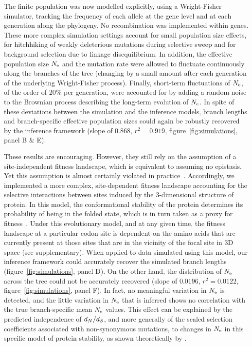 The finite population was now modelled explicitly, using a Wright-Fisher simulator, tracking the frequency of each {allele} at the gene level and at each generation along the phylogeny.
No {recombination} was implemented within genes.
These more complex simulation settings account for small population size effects, for hitchhiking of weakly deleterious mutations during selective sweep and for background selection due to linkage disequilibrium.
In addition, the {effective population size} $N_{\text{e}}$ and the mutation rate were allowed to fluctuate continuously along the branches of the tree (changing by a small amount after each generation of the underlying Wright-Fisher process).
Finally, short-term fluctuations of $N_{\text{e}}$, of the order of 20\% per generation, were accounted for by adding a random noise to the Brownian process describing the long-term evolution of $N_{\text{e}}$.
In spite of these deviations between the simulation and the inference models, branch lengths and branch-specific {effective population sizes} could again be robustly recovered by the inference framework (slope of $0.868$, $r^2=0.919$, figure~\ref{fig:simulations}, panel B \& E).

These results are encouraging.
However, they still rely on the assumption of a site-independent fitness landscape, which is equivalent to assuming no epistasis.
Yet this assumption is almost certainly violated in practice~\citep{Pollock2014,Shah2015}.
Accordingly, we implemented a more complex, site-dependent fitness landscape accounting for the selective interactions between sites induced by the 3-dimensional structure of protein.
In this model, the conformational stability of the protein determines its probability of being in the folded state, which is in turn taken as a proxy for fitness~\citep{Williams2006, Goldstein2011, Pollock2012}.
Under this evolutionary model, and at any given time, the fitness landscape at a particular {codon} site is dependent on the amino acids that are currently present at those sites that are in the vicinity of the focal site in 3D space (see supplementary).
When applied to data simulated using this model, our inference framework could accurately recover the simulated branch lengths (figure~\ref{fig:simulations}, panel D).
On the other hand, the distribution of $N_{\text{e}}$ across the tree could not be accurately recovered (slope of $0.0196$, $r^2 = 0.0122$, figure~\ref{fig:simulations}, panel F).
In fact, no meaningful variation in $N_{\text{e}}$ is detected, and the little variation in $N_{\text{e}}$ that is inferred shows no correlation with the true branch-specific mean $N_{\text{e}}$ values.
This effect can be explained by the predicted independence of $d_N / d_S$, and more generally of the scaled selection coefficients associated with {non-synonymous} mutations, to changes in $N_{\text{e}}$ in this specific model of protein stability, as shown theoretically by \citet{Goldstein2013}.

